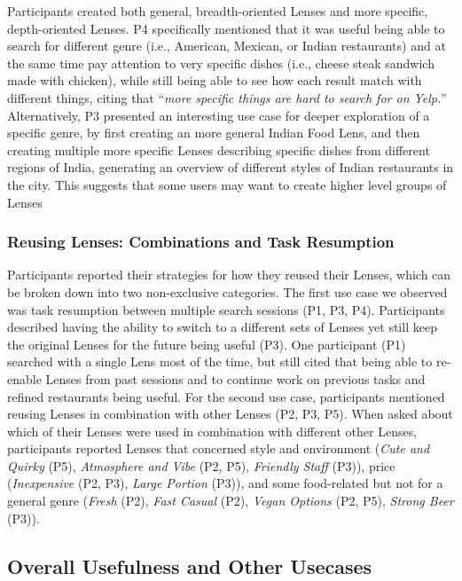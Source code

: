 Participants created both general, breadth-oriented Lenses and more specific, depth-oriented Lenses. P4 specifically mentioned that it was useful being able to search for different genre (i.e., American, Mexican, or Indian restaurants) and at the same time pay attention to very specific dishes (i.e., cheese steak sandwich made with chicken), while still being able to see how each result match with different things, citing that ``\emph{more specific things are hard to search for on Yelp.}'' Alternatively, P3 presented an interesting use case for deeper exploration of a specific genre, by first creating an more general Indian Food Lens, and then creating multiple more specific Lenses describing specific dishes from different regions of India, generating an overview of different styles of Indian restaurants in the city. This suggests that some users may want to create higher level groups of Lenses

\subsubsection{Reusing Lenses: Combinations and Task Resumption}

Participants reported their strategies for how they reused their Lenses, which can be broken down into two non-exclusive categories. The first use case we observed was task resumption between multiple search sessions (P1, P3, P4). Participants described having the ability to switch to a different sets of Lenses yet still keep the original Lenses for the future being useful (P3). One participant (P1) searched with a single Lens most of the time, but still cited that being able to re-enable Lenses from past sessions and to continue work on previous tasks and refined restaurants being useful. For the second use case, participants mentioned reusing Lenses in combination with other Lenses (P2, P3, P5). When asked about which of their Lenses were used in combination with different other Lenses, participants reported Lenses that concerned style and environment (\emph{Cute and Quirky} (P5), \emph{Atmosphere and Vibe} (P2, P5), \emph{Friendly Staff} (P3)), price (\emph{Inexpensive} (P2, P3), \emph{Large Portion} (P3)), and some food-related but not for a general genre (\emph{Fresh} (P2), \emph{Fast Casual} (P2), \emph{Vegan Options} (P2, P5), \emph{Strong Beer} (P3)).

\subsection{Overall Usefulness and Other Usecases}


